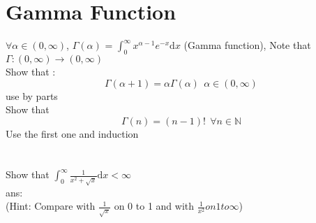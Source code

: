 \documentclass{article}
\begin{document}
\section{Gamma Function}
$\forall \alpha \in (0,\infty)$, $\Gamma(\alpha)$ =  $\int_{0}^{\infty}x^{\alpha-1}e^{-x}\mathrm d x$ (Gamma function), Note that $\Gamma:(0,\infty)\rightarrow(0,\infty)$\\
Show that :
\begin{equation}
    \Gamma(\alpha + 1) = \alpha \Gamma(\alpha) \:\: \alpha \in (0,\infty)
\end{equation}
use by parts\\
Show that \\
\begin{equation}
    \Gamma(n) = (n-1)!\:\:\forall n \in \mathbb N 
\end{equation}
Use the first one and induction
\section{}
Show that $\int_{0}^{\infty}\frac{1}{x^2 + \sqrt{x}} \mathrm d x < \infty$\\
ans:\\
(Hint: Compare with $\frac{1}{\sqrt x}$ on 0 to 1 and with $\frac{1}{x^2} on 1 to \infty$)
\end{document}
